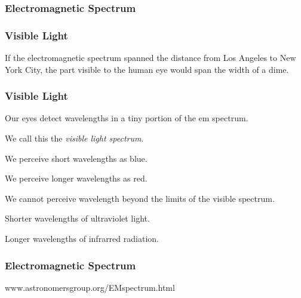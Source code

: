 \documentclass[12pt]{beamer}\usepackage[]{graphicx}\usepackage[]{color}
\begin{document}

\begin{frame}
\frametitle{Electromagnetic Spectrum}
\begin{center}
\end{center}
\end{frame}


\begin{frame}
\frametitle{Visible Light}

If the electromagnetic spectrum spanned the distance from Los Angeles to New 
York City, the part visible to the human eye would span the width of a dime.
\eb

\end{frame}


\begin{frame}
\frametitle{Visible Light}

\bi
  \item Our eyes detect wavelengths in a tiny portion of the em spectrum.
  \item We call this the \textit{visible light spectrum}.
  \item We perceive short wavelengths as blue.
  \item We perceive longer wavelengths as red.
  \item We cannot perceive wavelength beyond the limits of the visible spectrum.
  \item Shorter wavelengths of ultraviolet light.
  \item Longer wavelengths of infrarred radiation.
\ei

\end{frame}


\begin{frame}
\frametitle{Electromagnetic Spectrum}
\begin{center}

{\lolit www.astronomersgroup.org/EMspectrum.html}
\end{center}
\end{frame}

\end{document}
